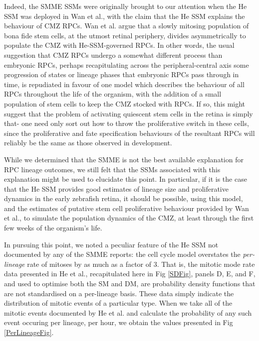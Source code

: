 Indeed, the SMME SSMs were originally brought to our attention when the He SSM was deployed in Wan et al.\cite{Wan2016}, with the claim that the He SSM explains the behaviour of CMZ RPCs. Wan et al. argue that a slowly mitosing population of bona fide stem cells, at the utmost retinal periphery, divides asymmetrically to populate the CMZ with He-SSM-governed RPCs. In other words, the usual suggestion that CMZ RPCs undergo a somewhat different process than embryonic RPCs, perhaps recapitulating across the peripheral-central axis some progression of states or lineage phases that embryonic RPCs pass through in time\cite{Harris1998}, is repudiated in favour of one model which describes the behaviour of all RPCs throughout the life of the organism, with the addition of a small population of stem cells to keep the CMZ stocked with RPCs. If so, this might suggest that the problem of activating quiescent stem cells in the retina is simply that- one need only sort out how to throw the proliferative switch in these cells, since the proliferative and fate specification behaviours of the resultant RPCs will reliably be the same as those observed in development.

While we determined that the SMME is not the best available explanation for RPC lineage outcomes, we still felt that the SSMs associated with this explanation might be used to elucidate this point. In particular, if it is the case that the He SSM provides good estimates of lineage size and proliferative dynamics in the early zebrafish retina, it should be possible, using this model, and the estimates of putative stem cell proliferative behaviour provided by Wan et al., to simulate the population dynamics of the CMZ, at least through the first few weeks of the organism's life.

In pursuing this point, we noted a peculiar feature of the He SSM not documented by any of the SMME reports: the cell cycle model overstates the  \textit{per-lineage} rate of mitoses by as much as a factor of 3. That is, the mitotic mode rate data presented in He et al., recapitulated here in Fig \ref{SDFig}, panels D, E, and F, and used to optimise both the SM and DM, are probability density functions that are not standardised on a per-lineage basis. These data simply indicate the distribution of mitotic events of a particular type. When we take all of the mitotic events documented by He et al. and calculate the probability of any such event occuring per lineage, per hour, we obtain the values presented in Fig \ref{PerLineageFig}. 

